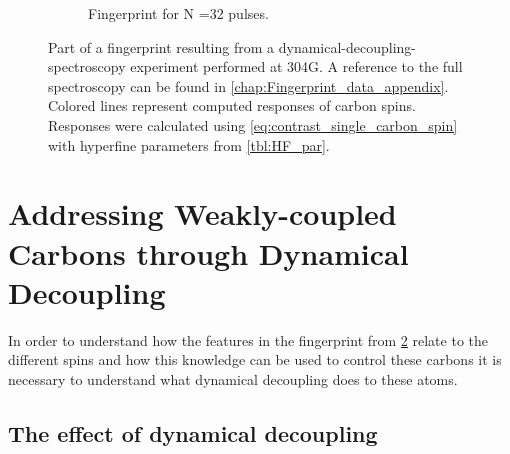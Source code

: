 \begin{figure}[htbp]
\begin{subfigure}[t]{\textwidth}
        \caption{Fingerprint for N =32 pulses. }
        \label{fig:FP32}
    \end{subfigure}
    \caption{Part of a fingerprint resulting from a dynamical-decoupling-spectroscopy experiment performed at 304G. A reference to the full spectroscopy can be found in \cref{chap:Fingerprint_data_appendix}.  Colored lines represent computed responses of carbon spins. Responses were calculated using \cref{eq:contrast_single_carbon_spin} with hyperfine parameters from \cref{tbl:HF_par}. }
    \label{fig:FP}
\end{figure}

\section{Addressing Weakly-coupled Carbons through Dynamical Decoupling}
\label{sec:controllingacarbonthroughdynamicaldecoupling}

In order to understand how the features in the fingerprint from \cref{fig:FP} relate to the different spins and how this knowledge can be used to control these carbons it is necessary to understand what dynamical decoupling does to these atoms.

\subsection{The effect of dynamical decoupling}


